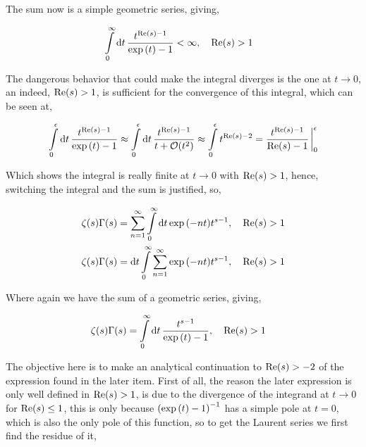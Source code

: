 The sum now is a simple geometric series, giving,

\begin{align*}
    &\int\limits_0^\infty\dd{t}\frac{t^{\textnormal{Re}\qty(s)-1}}{\exp\qty(t)-1}<\infty,\ \ \ \textnormal{Re}\qty(s)>1
\end{align*}

The dangerous behavior that could make the integral diverges is the one at $t\rightarrow0$, an indeed, $\textnormal{Re}\qty(s)>1$, is 
sufficient for the convergence of this integral, which can be seen at,

\begin{align*}
    \int\limits_0^\epsilon\dd{t}\frac{t^{\textnormal{Re}\qty(s)-1}}{\exp\qty(t)-1}\approx\int\limits_0^\epsilon\dd{t}\frac{t^{\textnormal{Re}\qty(s)-1}}{t+\mathcal O\qty(t^2)}\approx\int\limits_0^\epsilon t^{\textnormal{Re}\qty(s)-2}=\frac{t^{\textnormal{Re}\qty(s)-1}}{\textnormal{Re}\qty(s)-1}\eval_0^\epsilon
\end{align*}

Which shows the integral is really finite at $t\rightarrow 0$ with $\textnormal{Re}\qty(s)>1$, hence, switching the integral and the 
sum is justified, so,

\begin{align*}
    \zeta(s)\Gamma\qty(s)&=\sum\limits_{n=1}^\infty\int\limits_0^\infty\dd{t}\exp\qty(-nt)t^{s-1},\ \ \ \textnormal{Re}\qty(s)>1\\
    \zeta(s)\Gamma\qty(s)&=\dd{t}\int\limits_0^\infty\sum\limits_{n=1}^\infty\exp\qty(-nt)t^{s-1},\ \ \ \textnormal{Re}\qty(s)>1
\end{align*}

Where again we have the sum of a geometric series, giving,

\begin{align*}
    \zeta(s)\Gamma\qty(s)&=\int\limits_0^\infty\dd{t}\frac{t^{s-1}}{\exp\qty(t)-1},\ \ \ \textnormal{Re}\qty(s)>1
\end{align*}

\probitem{}

The objective here is to make an analytical continuation to $\textnormal{Re}\qty(s)>-2$ of the expression found in the later item. 
First of all, the reason the later expression is only well defined in $\textnormal{Re}\qty(s)>1$, is due to the divergence of the 
integrand at $t\rightarrow 0$ for $\textnormal{Re}\qty(s)\leq1$, this is only because $\qty(\exp\qty(t)-1)^{-1}$ has a simple pole at $t=0$, which 
is also the only pole of this function, so to get the Laurent series we first find the residue of it,

